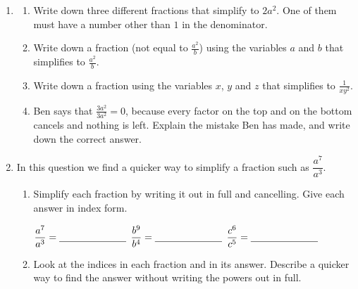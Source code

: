 \documentclass[12pt,a4paper]{article}
\newcommand{\ansline}[1][2.2cm]{\underline{\hspace{#1}}}
\begin{document}
\begin{enumerate}[resume]

\item
\begin{enumerate}
  \item Write down three different fractions that simplify to $2a^2$. One of
        them must have a number other than $1$ in the denominator.

\vspace{12pt}
\ansline[3.4cm]\hfill \ansline[3.4cm]\hfill \ansline[3.4cm]

\vspace{12pt}
  \item Write down a fraction (not equal to $\frac{a^2}{b}$) using the variables $a$ and $b$ that simplifies
        to $\frac{a^2}{b}$.

\vspace{16pt}
\ansline[5cm]


\vspace{8pt}
\item Write down a fraction using the variables $x$, $y$ and $z$ that simplifies to
      $\frac{1}{xy^2}$.

\vspace{16pt}
\ansline[5cm]


\vspace{8pt}
  \item Ben says that $\frac{3a^2}{3a^2}=0$, because every factor on the top
        and on the bottom cancels and nothing is left. Explain the mistake Ben
        has made, and write down the correct answer.

\vspace{6pt}
\ansline[16cm]

\vspace{16pt}
\ansline[16cm]
\end{enumerate}

\item In this question we find a quicker way to simplify a fraction such as
$\dfrac{a^7}{a^3}$.
\begin{enumerate}
  \item Simplify each fraction by writing it out in full and cancelling. Give
        each answer in index form.

\vspace{8pt}
$\dfrac{a^7}{a^3}=\ansline[2.4cm]$ \hfill $\dfrac{b^9}{b^4}=\ansline[2.4cm]$
\hfill $\dfrac{c^6}{c^5}=\ansline[2.4cm]$

\vspace{3.5em}
  \item Look at the indices in each fraction and in its answer. Describe a
        quicker way to find the answer without writing the powers out in full.


\end{enumerate}
\end{enumerate}
\end{document}
